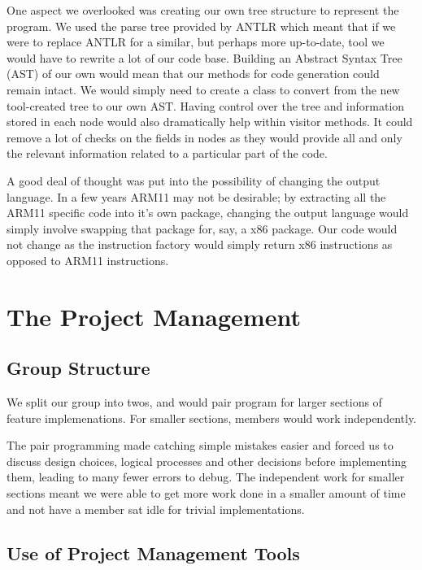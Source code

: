 \documentclass[11pt,a4paper]{article}
\begin{document}
One aspect we overlooked was creating our own tree structure to represent the program. We used the parse tree provided by ANTLR which meant that if we were to replace ANTLR for a similar, but perhaps more up-to-date, tool we would have to rewrite a lot of our code base. Building an Abstract Syntax Tree (AST) of our own would mean that our methods for code generation could remain intact. We would simply need to create a class to convert from the new tool-created tree to our own AST. Having control over the tree and information stored in each node would also dramatically help within visitor methods. It could remove a lot of checks on the fields in nodes as they would provide all and only the relevant information related to a particular part of the code. 

A good deal of thought was put into the possibility of changing the output language. In a few years ARM11 may not be desirable; by extracting all the ARM11 specific code into it's own package, changing the output language would simply involve swapping that package for, say, a x86 package. Our code would not change as the instruction factory would simply return x86 instructions as opposed to ARM11 instructions.

\section{The Project Management}
\label{sec:The Project Management}

\subsection{Group Structure}
\label{sub:Group Structure}

We split our group into twos, and would pair program for larger sections of feature implemenations. For smaller sections, members would work independently.

The pair programming made catching simple mistakes easier and forced us to discuss design choices, logical processes and other decisions before implementing them, leading to many fewer errors to debug. The independent work for smaller sections meant we were able to get more work done in a smaller amount of time and not have a member sat idle for trivial implementations.

\subsection{Use of Project Management Tools}
\label{sub:Use of Project Management Tools}
\end{document}
